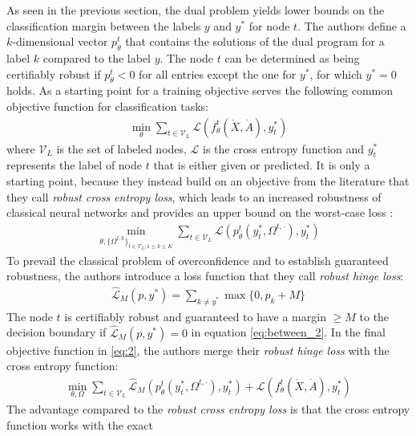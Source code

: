 \documentclass[a4paper,preprint]{sig-alternate}
\begin{document}
As seen in the previous section, the dual problem yields lower bounds on the classification margin
between the labels $y$ and $y^{\ast}$ for node $t$.
The authors define a $k$-dimensional vector $p_{\theta}^t$ that contains the solutions of the dual program
for a label $k$ compared to the label $y$. The node $t$ can be determined as being certifiably robust if $p_{\theta}^t < 0$
for all entries except the one for $y^{\ast}$, for which $y^{\ast} = 0$ holds. \cite{Zuegner_2019}
As a starting point for a training objective serves the following common objective function for classification tasks:
\begin{gather}
    \min_{\theta} \sum_{t \in \mathcal{V}_L} \mathcal{L} (f_{\theta}^t (\dot{X}, \dot{A}), y_t^{\ast})
\end{gather}
where $\mathcal{V}_L$ is the set of labeled nodes, $\mathcal{L}$ is the cross entropy function and $y_t^{\ast}$ represents
the label of node $t$ that is either given or predicted.
It is only a starting point, because they instead build on an objective from the literature that they call \textit{robust cross entropy loss},
which leads to an increased robustness of classical neural networks and provides an upper bound on the worst-case loss \cite{Zuegner_2019}:
\begin{gather}
\label{eq:between}
    \min_{\theta, \{\Omega^{t, k}\}_{t \in \mathcal{V}_L, 1 \leq k \leq K}} \sum_{t \in \mathcal{V}_L} \mathcal{L} (p_{\theta}^t (y_t^{\ast}, \Omega^{t, \cdot}), y_t^{\ast})
\end{gather}
To prevail the classical problem of overconfidence and to establish guaranteed robustness, the authors introduce 
a loss function that they call \textit{robust hinge loss}:
\begin{gather}
\label{eq:between_2}
    \mathcal{\hat{L}}_M (p, y^{\ast}) = \sum_{k \neq y^{\ast}} \max \{0, p_k + M\}
\end{gather}
The node $t$ is certifiably robust and guaranteed to have a margin $\geq M$ to the decision boundary if $\mathcal{\hat{L}}_M (p, y^{\ast}) = 0$
in equation \ref{eq:between_2}. \cite{Zuegner_2019}
In the final objective function in \ref{eq:2}, the authors merge their \textit{robust hinge loss} with the cross entropy function:
\begin{gather}
\label{eq:2}
    \min_{\theta, \Omega} \sum_{t \in \mathcal{V}_L} \mathcal{\hat{L}}_M (p_{\theta}^t (y_t^{\ast}, \Omega^{t, \cdot}), y_t^{\ast}) + \mathcal{L} (f_{\theta}^t (\dot{X}, \dot{A}), y_t^{\ast})
\end{gather}
The advantage compared to the \textit{robust cross entropy loss} is that the cross entropy function works with the exact
\end{document}
